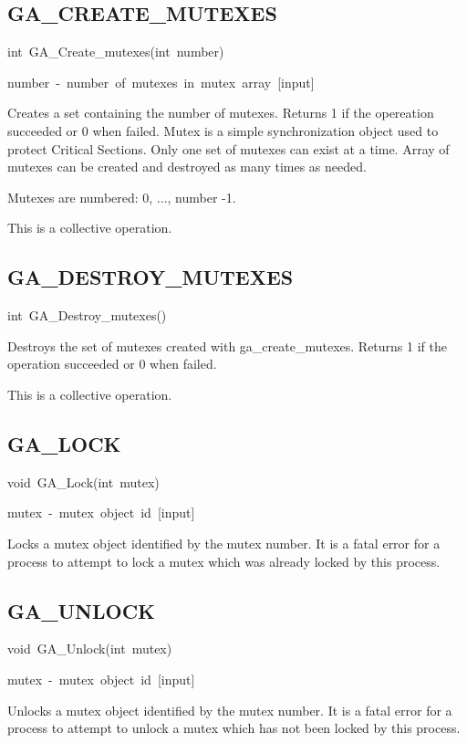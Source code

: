 \subsection*{\label{sub:GA_CREATE_MUTEXES}GA\_CREATE\_MUTEXES}
\begin{lyxcode}
int~GA\_Create\_mutexes(int~number)



number~-~number~of~mutexes~in~mutex~array~{[}input{]}
\end{lyxcode}
Creates a set containing the number of mutexes. Returns 1 if the opereation
succeeded or 0 when failed. Mutex is a simple synchronization object
used to protect Critical Sections. Only one set of mutexes can exist
at a time. Array of mutexes can be created and destroyed as many times
as needed.

Mutexes are numbered: 0, ..., number -1.

This is a collective operation. 


\subsection*{GA\_DESTROY\_MUTEXES}
\begin{lyxcode}
int~GA\_Destroy\_mutexes()
\end{lyxcode}
Destroys the set of mutexes created with ga\_create\_mutexes. Returns
1 if the operation succeeded or 0 when failed.

This is a collective operation. 


\subsection*{GA\_LOCK}
\begin{lyxcode}
void~GA\_Lock(int~mutex)



mutex~-~mutex~object~id~{[}input{]}
\end{lyxcode}
Locks a mutex object identified by the mutex number. It is a fatal
error for a process to attempt to lock a mutex which was already locked
by this process. 


\subsection*{GA\_UNLOCK}
\begin{lyxcode}
void~GA\_Unlock(int~mutex)



mutex~-~mutex~object~id~{[}input{]}
\end{lyxcode}
Unlocks a mutex object identified by the mutex number. It is a fatal
error for a process to attempt to unlock a mutex which has not been
locked by this process. 


